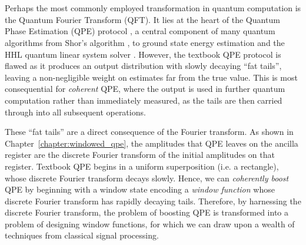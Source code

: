 \part{}
\ifpdf
    \graphicspath{{Chapter3/Figs/Raster/}{Chapter3/Figs/PDF/}{Chapter3/Figs/}{Chapter3/piecewise_QSVT/}}
\else
    \graphicspath{{Chapter3/Figs/Vector/}{Chapter3/Figs/}{Chapter3/piecewise_QSVT/}}
\fi
\label{part:boosting_qpe}

Perhaps the most commonly employed transformation in quantum computation is the Quantum Fourier Transform (QFT). It lies at the heart of the Quantum Phase Estimation (QPE) protocol  \cite{kitaev1995quantum, Cleve_1998}, a central component of many quantum algorithms from Shor's algorithm \cite{shor1999polynomial}, to ground state energy estimation \cite{Aspuru_Guzik_2005} and the HHL quantum linear system solver \cite{harrow2009quantum}. However, the textbook QPE protocol \cite{Nielsen_Chuang_2010} is flawed as it produces an output distribution with slowly decaying ``fat tails'', leaving a non-negligible weight on estimates far from the true value. This is most consequential for \emph{coherent} QPE, where the output is used in further quantum computation rather than immediately measured, as the tails are then carried through into all subsequent operations.

These ``fat tails'' are a direct consequence of the Fourier transform. As shown in Chapter~\ref{chapter:windowed_qpe}, the amplitudes that QPE leaves on the ancilla register are the discrete Fourier transform of the initial amplitudes on that register. Textbook QPE begins in a uniform superposition (i.e. a rectangle), whose discrete Fourier transform decays slowly. Hence, we can \emph{coherently boost} QPE by beginning with a window state encoding a \emph{window function} whose discrete Fourier transform has rapidly decaying tails. Therefore, by harnessing the discrete Fourier transform, the problem of boosting QPE is transformed into a problem of designing window functions, for which we can draw upon a wealth of techniques from classical signal processing.


